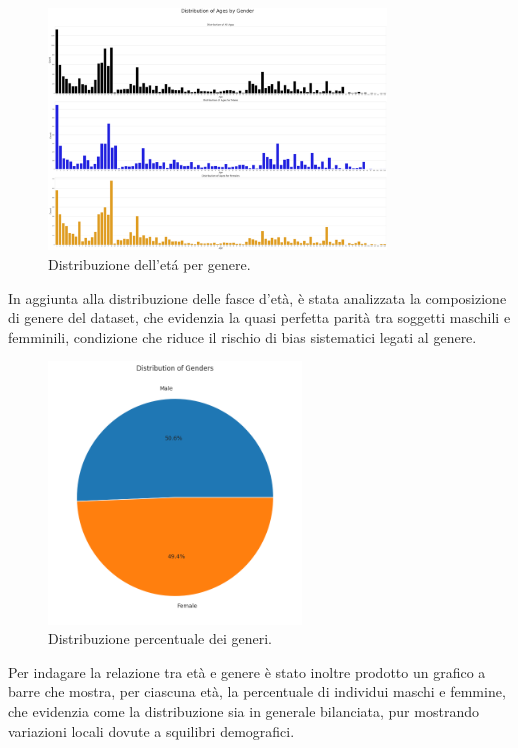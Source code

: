 \documentclass[a4paper,12pt]{report}
\begin{document}
	\begin{figure}[H]
		\centering
		\includegraphics[width=0.8\textwidth]{img/ages_bygender_image.png}
		\caption{Distribuzione dell'etá per genere.}
	\end{figure}
	
	In aggiunta alla distribuzione delle fasce d'età, è stata analizzata la composizione di genere del dataset, che evidenzia la quasi perfetta parità tra soggetti maschili e femminili, condizione che riduce il rischio di bias sistematici legati al genere. 
	
	\begin{figure}[H]
		\centering
		\includegraphics[width=0.6\textwidth]{img/pie_gender_images.png}
		\caption{Distribuzione percentuale dei generi.}
	\end{figure}
	
	Per indagare la relazione tra età e genere è stato inoltre prodotto un grafico a barre che mostra, per ciascuna età, la percentuale di individui maschi e femmine, che evidenzia come la distribuzione sia in generale bilanciata, pur mostrando variazioni locali dovute a squilibri demografici.
	
\end{document}

